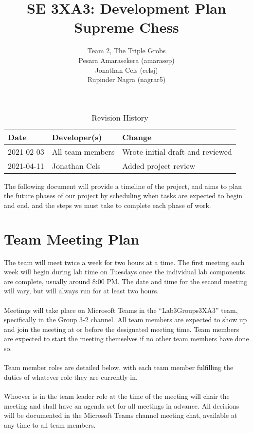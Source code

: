 \documentclass{article}
\title{SE 3XA3: Development Plan\\Supreme Chess}
\author{Team 2, The Triple Grobs
        \\ Pesara Amarasekera (amarasep)
        \\ Jonathan Cels (celsj)
        \\ Rupinder Nagra (nagrar5)
}
\date{}
\begin{document}
\begin{table}[hp]
\caption{Revision History} \label{TblRevisionHistory}
\begin{tabularx}{\textwidth}{llX}
\toprule
\textbf{Date} & \textbf{Developer(s)} & \textbf{Change}\\
\midrule
2021-02-03 & All team members & Wrote initial draft and reviewed\\
2021-04-11 & Jonathan Cels & Added project review\\

\bottomrule
\end{tabularx}
\end{table}

\newpage

\maketitle

The following document will provide a timeline of the project, and aims to plan the future phases of our project by scheduling when tasks are expected to begin and end, and the steps we must take to complete each phase of work.

\section{Team Meeting Plan}
The team will meet twice a week for two hours at a time. The first meeting each week will begin during lab time on Tuesdays once the individual lab components are complete, usually around 8:00 PM. The date and time for the second meeting will vary, but will always run for at least two hours.
\\
\\ Meetings will take place on Microsoft Teams in the ``Lab3Groups3XA3'' team, specifically in the Group 3-2 channel. All team members are expected to show up and join the meeting at or before the designated meeting time. Team members are expected to start the meeting themselves if no other team members have done so.
\\
\\ Team member roles are detailed below, with each team member fulfilling the duties of whatever role they are currently in.
\\
\\ Whoever is in the team leader role at the time of the meeting will chair the meeting and shall have an agenda set for all meetings in advance. All decisions will be documented in the Microsoft Teams channel meeting chat, available at any time to all team members.
\end{document}
